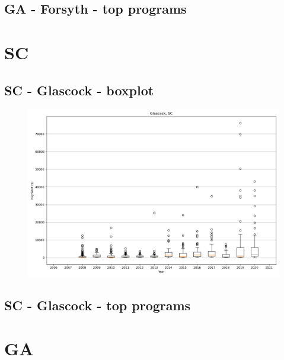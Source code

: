 \subsection*{GA - Forsyth - top programs}

\newpage
\section*{SC}
\subsection*{SC - Glascock - boxplot}
\begin{figure}[h]
\centering
\includegraphics[width=7in]{../output/boxplots/counties/Glascock-SC_boxplot.png}
\end{figure}


\subsection*{SC - Glascock - top programs}

\newpage
\section*{GA}
